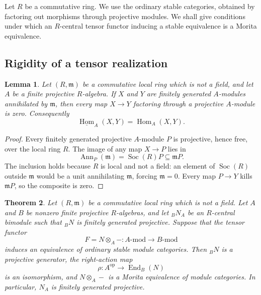 \documentclass[12pt,a4paper,english,reqno]{amsart}
\numberwithin{equation}{section}
\theoremstyle{plain}
\newtheorem{theorem}{Theorem}[section]
\newtheorem{lemma}[theorem]{Lemma}
\theoremstyle{definition}
\begin{document}
Let $R$ be a commutative ring. We use the ordinary stable
categories, obtained by factoring out morphisms through projective
modules. We shall give conditions under which an $R$-central
tensor functor inducing a stable equivalence is a Morita
equivalence.

\subsection{Rigidity of a tensor realization}

\begin{lemma}
\label{lem:rigidity-special-fibre-hom}
Let $(R,\mathfrak m)$ be a commutative local ring which is not a
field, and let $A$ be a finite projective $R$-algebra.  If $X$ and $Y$
are finitely generated $A$-modules annihilated by $\mathfrak m$, then
every map $X\to Y$ factoring through a projective $A$-module is zero.
Consequently
\[
 \underline{\operatorname{Hom}}_A(X,Y)
   =\operatorname{Hom}_A(X,Y).
\]
\end{lemma}

\begin{proof}
Every finitely generated projective $A$-module $P$ is projective, hence
free, over the local ring $R$.  The image of any map $X\to P$ lies in
\[
 \operatorname{Ann}_P(\mathfrak m)
   =\operatorname{Soc}(R)P\subseteq\mathfrak mP.
\]
The inclusion holds because $R$ is local and not a field: an element
of $\operatorname{Soc}(R)$ outside $\mathfrak m$ would be a unit
annihilating $\mathfrak m$, forcing $\mathfrak m=0$.  Every map
$P\to Y$ kills $\mathfrak mP$, so the composite is zero.
\end{proof}

\begin{theorem}
\label{thm:rigidity-nonfield-artin-base}
Let $(R,\mathfrak m)$ be a commutative local ring which is not a
field.  Let $A$ and $B$ be nonzero finite projective $R$-algebras,
and let ${}_BN_A$ be an $R$-central bimodule such that ${}_BN$ is
finitely generated projective.  Suppose that the tensor functor
\[
 F=N\otimes_A-:A\text{-}\mathrm{mod}
       \longrightarrow B\text{-}\mathrm{mod}
\]
induces an equivalence of ordinary stable module categories.
Then ${}_BN$ is a projective generator, the right-action map
\[
 \rho:A^{\mathrm{op}}\longrightarrow\operatorname{End}_B(N)
\]
is an isomorphism, and $N\otimes_A-$ is a Morita equivalence of
module categories.  In particular, $N_A$ is finitely generated projective.
\end{theorem}
\end{document}
